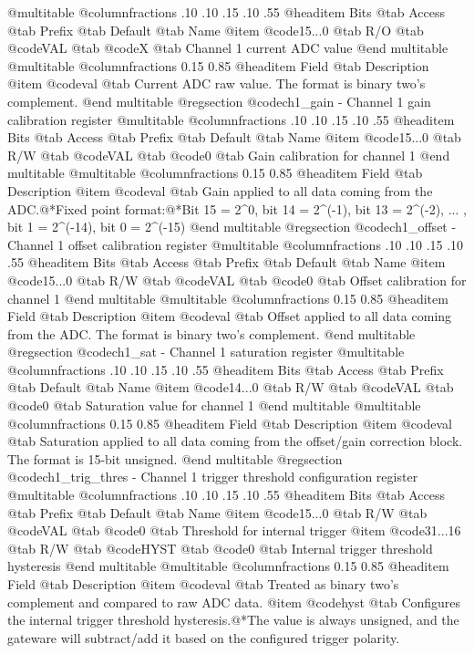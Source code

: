 @multitable @columnfractions .10 .10 .15 .10 .55
@headitem Bits @tab Access @tab Prefix @tab Default @tab Name
@item @code{15...0}
@tab R/O @tab
@code{VAL}
@tab @code{X} @tab 
Channel 1 current ADC value
@end multitable
@multitable @columnfractions 0.15 0.85
@headitem Field @tab Description
@item @code{val} @tab Current ADC raw value. The format is binary two's complement.
@end multitable
@regsection @code{ch1_gain} - Channel 1 gain calibration register
@multitable @columnfractions .10 .10 .15 .10 .55
@headitem Bits @tab Access @tab Prefix @tab Default @tab Name
@item @code{15...0}
@tab R/W @tab
@code{VAL}
@tab @code{0} @tab 
Gain calibration for channel 1
@end multitable
@multitable @columnfractions 0.15 0.85
@headitem Field @tab Description
@item @code{val} @tab Gain applied to all data coming from the ADC.@*Fixed point format:@*Bit 15 = 2^0, bit 14 = 2^(-1), bit 13 = 2^(-2), ... , bit 1 = 2^(-14), bit 0 = 2^(-15)
@end multitable
@regsection @code{ch1_offset} - Channel 1 offset calibration register
@multitable @columnfractions .10 .10 .15 .10 .55
@headitem Bits @tab Access @tab Prefix @tab Default @tab Name
@item @code{15...0}
@tab R/W @tab
@code{VAL}
@tab @code{0} @tab 
Offset calibration for channel 1
@end multitable
@multitable @columnfractions 0.15 0.85
@headitem Field @tab Description
@item @code{val} @tab Offset applied to all data coming from the ADC. The format is binary two's complement.
@end multitable
@regsection @code{ch1_sat} - Channel 1 saturation register
@multitable @columnfractions .10 .10 .15 .10 .55
@headitem Bits @tab Access @tab Prefix @tab Default @tab Name
@item @code{14...0}
@tab R/W @tab
@code{VAL}
@tab @code{0} @tab 
Saturation value for channel 1
@end multitable
@multitable @columnfractions 0.15 0.85
@headitem Field @tab Description
@item @code{val} @tab Saturation applied to all data coming from the offset/gain correction block. The format is 15-bit unsigned.
@end multitable
@regsection @code{ch1_trig_thres} - Channel 1 trigger threshold configuration register
@multitable @columnfractions .10 .10 .15 .10 .55
@headitem Bits @tab Access @tab Prefix @tab Default @tab Name
@item @code{15...0}
@tab R/W @tab
@code{VAL}
@tab @code{0} @tab 
Threshold for internal trigger
@item @code{31...16}
@tab R/W @tab
@code{HYST}
@tab @code{0} @tab 
Internal trigger threshold hysteresis
@end multitable
@multitable @columnfractions 0.15 0.85
@headitem Field @tab Description
@item @code{val} @tab Treated as binary two's complement and compared to raw ADC data.
@item @code{hyst} @tab Configures the internal trigger threshold hysteresis.@*The value is always unsigned, and the gateware will subtract/add it based on the configured trigger polarity.
